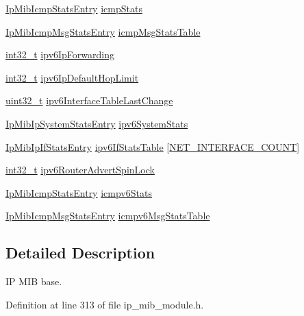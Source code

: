 \begin{DoxyCompactItemize}
\hyperlink{structIpMibIcmpStatsEntry}{Ip\+Mib\+Icmp\+Stats\+Entry} \hyperlink{structIpMibBase_a8dc95143f16af236a35dbe5660727660}{icmp\+Stats}
\item 
\hyperlink{structIpMibIcmpMsgStatsEntry}{Ip\+Mib\+Icmp\+Msg\+Stats\+Entry} \hyperlink{structIpMibBase_a7954b02fb27ef8916d73dd9c88db4f96}{icmp\+Msg\+Stats\+Table}
\item 
\hyperlink{stdint_8h_ab1967d8591af1a4e48c37fd2b0f184d0}{int32\+\_\+t} \hyperlink{structIpMibBase_a7e68d20351a09351a9c6be35e047f903}{ipv6\+Ip\+Forwarding}
\item 
\hyperlink{stdint_8h_ab1967d8591af1a4e48c37fd2b0f184d0}{int32\+\_\+t} \hyperlink{structIpMibBase_a1310780a8badec82eb2f12c31e57bcf5}{ipv6\+Ip\+Default\+Hop\+Limit}
\item 
\hyperlink{stdint_8h_a435d1572bf3f880d55459d9805097f62}{uint32\+\_\+t} \hyperlink{structIpMibBase_a8df557860ba74b2963de2b77b8d8fdb0}{ipv6\+Interface\+Table\+Last\+Change}
\item 
\hyperlink{structIpMibIpSystemStatsEntry}{Ip\+Mib\+Ip\+System\+Stats\+Entry} \hyperlink{structIpMibBase_a016a7acc776e442238209233f60eb339}{ipv6\+System\+Stats}
\item 
\hyperlink{structIpMibIpIfStatsEntry}{Ip\+Mib\+Ip\+If\+Stats\+Entry} \hyperlink{structIpMibBase_acc0b379352de70154f7afdfe8db306eb}{ipv6\+If\+Stats\+Table} \mbox{[}\hyperlink{net__config_8h_a116f850ebcb023ffa3e6b8de10c5cb35}{N\+E\+T\+\_\+\+I\+N\+T\+E\+R\+F\+A\+C\+E\+\_\+\+C\+O\+U\+NT}\mbox{]}
\item 
\hyperlink{stdint_8h_ab1967d8591af1a4e48c37fd2b0f184d0}{int32\+\_\+t} \hyperlink{structIpMibBase_a6c51a0cf2c844688ec67bf89553ad0c9}{ipv6\+Router\+Advert\+Spin\+Lock}
\item 
\hyperlink{structIpMibIcmpStatsEntry}{Ip\+Mib\+Icmp\+Stats\+Entry} \hyperlink{structIpMibBase_a4d409d848258185928ffff00820a75f5}{icmpv6\+Stats}
\item 
\hyperlink{structIpMibIcmpMsgStatsEntry}{Ip\+Mib\+Icmp\+Msg\+Stats\+Entry} \hyperlink{structIpMibBase_a49b1f93d0a10fafa8c2e380d356ee87b}{icmpv6\+Msg\+Stats\+Table}
\end{DoxyCompactItemize}


\subsection{Detailed Description}
IP M\+IB base. 

Definition at line 313 of file ip\+\_\+mib\+\_\+module.\+h.



